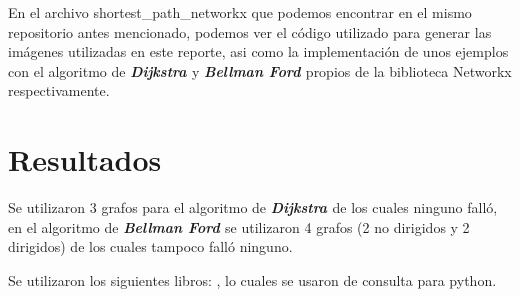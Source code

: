 \documentclass{report}
\newcommand{\dij}{{\bfseries {\textit{Dijkstra }}}}
\newcommand{\bell}{{\bfseries {\textit{Bellman Ford }}}}
\begin{document}
En el archivo shortest\_path\_networkx que podemos encontrar en el mismo repositorio antes mencionado, podemos ver el código utilizado para generar las imágenes utilizadas en este reporte, asi como la implementación de unos ejemplos con el algoritmo de \dij y \bell propios de la biblioteca Networkx respectivamente.
\section{Resultados}
Se utilizaron 3 grafos para el algoritmo de \dij de los cuales ninguno falló, en el algoritmo de \bell se utilizaron 4 grafos (2 no dirigidos y 2 dirigidos) de los cuales tampoco falló ninguno.

Se utilizaron los siguientes libros:
\cite{chun2001core}
\cite{van1991guia}
\cite{van2017tutorial}, lo cuales se usaron de consulta para python.


\end{document}
